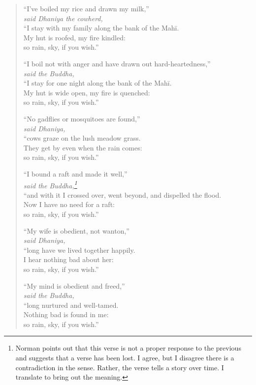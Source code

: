 \documentclass[12pt,openany]{book}%
\newcommand*{\scspeaker}[1]{\hspace{2em}\textit{#1}}
\begin{document}
\begin{verse}%
“I’ve boiled my rice and drawn my milk,” \\
\scspeaker{said Dhaniya the cowherd, }\\
“I stay with my family along the bank of the \textsanskrit{Mahī}. \\
My hut is roofed, my fire kindled: \\
so rain, sky, if you wish.” 

“I boil not with anger and have drawn out hard-heartedness,” \\
\scspeaker{said the Buddha, }\\
“I stay for one night along the bank of the \textsanskrit{Mahī}. \\
My hut is wide open, my fire is quenched: \\
so rain, sky, if you wish.” 

“No gadflies or mosquitoes are found,” \\
\scspeaker{said Dhaniya, }\\
“cows graze on the lush meadow grass. \\
They get by even when the rain comes: \\
so rain, sky, if you wish.” 

“I bound a raft and made it well,” \\
\scspeaker{said the Buddha,\footnote{Norman points out that this verse is not a proper response to the previous and suggests that a verse has been lost. I agree, but I disagree there is a contradiction in the sense. Rather, the verse tells a story over time. I translate to bring out the meaning. } }\\
“and with it I crossed over, went beyond, and dispelled the flood. \\
Now I have no need for a raft: \\
so rain, sky, if you wish.” 

“My wife is obedient, not wanton,” \\
\scspeaker{said Dhaniya, }\\
“long have we lived together happily. \\
I hear nothing bad about her: \\
so rain, sky, if you wish.” 

“My mind is obedient and freed,” \\
\scspeaker{said the Buddha, }\\
“long nurtured and well-tamed. \\
Nothing bad is found in me: \\
so rain, sky, if you wish.” 


\end{verse}
\end{document}
